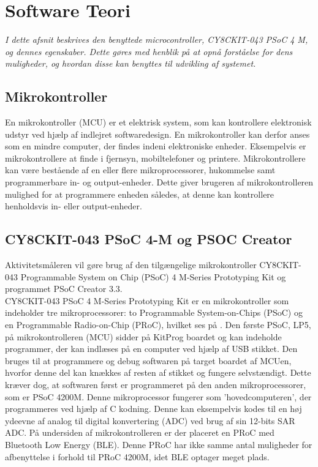 \section{Software Teori}
\textit{I dette afsnit beskrives den benyttede microcontroller, CY8CKIT-043 PSoC 4 M, og dennes egenskaber. Dette gøres med henblik på at opnå forståelse for dens muligheder, og hvordan disse kan benyttes til udvikling af systemet.}

\subsection{Mikrokontroller}
En mikrokontroller (MCU) er et elektrisk system, som kan kontrollere elektronisk udstyr ved hjælp af indlejret softwaredesign. En mikrokontroller kan derfor anses som en mindre computer, der findes indeni elektroniske enheder. Eksempelvis er mikrokontrollere at finde i fjernsyn, mobiltelefoner og printere. \citep{Scienceuddannelse,Tanenbaum2006} \newline
Mikrokontrollere kan være bestående af en eller flere mikroprocessorer, hukommelse samt programmerbare in- og output-enheder. Dette giver brugeren af mikrokontrolleren mulighed for at programmere enheden således, at denne kan kontrollere henholdsvis in- eller output-enheder. \citep{Scienceuddannelse,Tanenbaum2006}

\subsection{CY8CKIT-043 PSoC 4-M og PSOC Creator}
Aktivitetsmåleren vil gøre brug af den tilgængelige mikrokontroller CY8CKIT-043 Programmable System on Chip (PSoC) 4 M-Series Prototyping Kit og programmet PSoC Creator 3.3.\\
CY8CKIT-043 PSoC 4 M-Series Prototyping Kit er en mikrokontroller som indeholder tre mikroprocessorer: to Programmable System-on-Chips (PSoC) og en Programmable Radio-on-Chip (PRoC), hvilket ses på . Den første PSoC, LP5, på mikrokontrolleren (MCU) sidder på KitProg boardet og kan indeholde programmer, der kan indlæses på en computer ved hjælp af USB stikket. Den bruges til at programmere og debug softwaren på target boardet af MCUen, hvorfor denne del kan knækkes af resten af stikket og fungere selvstændigt. Dette kræver dog, at softwaren først er programmeret på den anden mikroprocessorer, som er PSoC 4200M. Denne mikroprocessor fungerer som 'hovedcomputeren', der programmeres ved hjælp af C kodning. Denne kan eksempelvis kodes til en høj ydeevne af analog til digital konvertering (ADC) ved brug af sin 12-bits SAR ADC. \newline
På undersiden af mikrokontrolleren er der placeret en PRoC med Bluetooth Low Energy (BLE). Denne PRoC har ikke samme antal muligheder for afbenyttelse i forhold til PRoC 4200M, idet BLE optager meget plads. \citep{CYPRESS2016PSoC,Semiconductor2016,CYPRESS2016Cortexm0}


